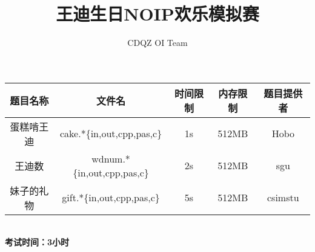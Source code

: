 \documentclass[a4paper]{article}
\begin{document}
\title{王迪生日NOIP欢乐模拟赛}
\author{CDQZ OI Team}
\maketitle
\begin{center}
\begin{tabular}{|c|c|c|c|c|}
\hline
题目名称 & 文件名 & 时间限制 & 内存限制 & 题目提供者 \\ \hline
蛋糕啃王迪 & cake.*\{in,out,cpp,pas,c\} & 1s & 512MB & Hobo\\ \hline
王迪数 & wdnum.*\{in,out,cpp,pas,c\} & 2s & 512MB & sgu \\ \hline
妹子的礼物 & gift.*\{in,out,cpp,pas,c\} & 5s & 512MB & csimstu \\ \hline
\end{tabular}
\vspace{15pt}
\\ {\large\textbf{考试时间：3小时}}
\end{center}
\tableofcontents




\end{document}
